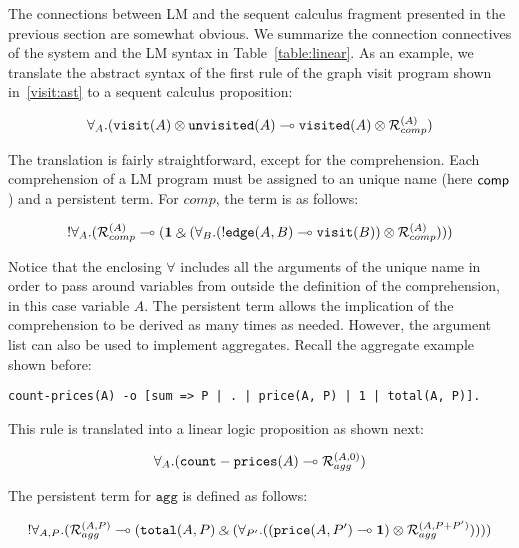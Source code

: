 The connections between LM and the sequent calculus fragment presented in the previous section
are somewhat obvious. We summarize the connection connectives of the system and
the LM syntax in Table~\ref{table:linear}. As an example, we translate the
abstract syntax of the first rule of the graph visit program shown
in~\ref{visit:ast} to a sequent calculus proposition:

\begin{align}
\forall_A. (\mathtt{visit}(A) \otimes \mathtt{unvisited}(A) \multimap
   \mathtt{visited}(A) \otimes \mathcal{R}_{comp}^{(A)})
\end{align}

The translation is fairly straightforward, except for the comprehension. Each
comprehension of a LM program must be assigned to an unique name (here
$\mathsf{comp}$) and a persistent term. For $comp$, the term is as follows:

\begin{align}
{!} \forall_A. (\mathcal{R}_{comp}^{(A)} \multimap (\mathbf{1} \mathbin{\binampersand}
         (\forall_B. ({!} \mathtt{edge}(A, B) \multimap
                                             \mathtt{visit}(B)) \otimes
          \mathcal{R}_{comp}^{(A)})))
\end{align}

Notice that the enclosing $\forall$ includes all the arguments of the unique
name in order to pass around variables from outside the definition of the
comprehension, in this case variable $A$. The persistent term allows the
implication of the comprehension to be derived as many times as needed.
However, the argument list can also be used to implement aggregates.
Recall the aggregate example shown before:

\begin{Verbatim}[fontsize=\codesize]
count-prices(A) -o [sum => P | . | price(A, P) | 1 | total(A, P)].
\end{Verbatim}

This rule is translated into a linear logic proposition as shown next:

\begin{align}
\forall_{A}. (\mathtt{count-prices}(A) \multimap \mathcal{R}_{agg}^{(A, 0)})
\end{align}

The persistent term for $\mathtt{agg}$ is defined as follows:

\begin{align}
{!} \forall_{A, P}. (\mathcal{R}_{agg}^{(A, P)} \multimap (\mathtt{total}(A, P)
            \mathbin{\binampersand} (\forall_{P'}.
               ((\mathtt{price}(A, P') \multimap \mathbf{1}) \otimes \mathcal{R}_{agg}^{(A, P +
                P')}))))
\end{align}


